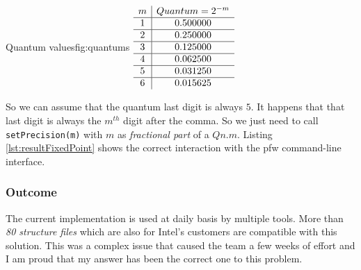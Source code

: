 \begin{figureGraphics}{Quantum values}{fig:quantums}
    $
    \begin{array}{c|c}
        m & Quantum = 2^{-m} \\
        \hline
        1 & 0.500000 \\
        \hline
        2 & 0.250000 \\
        \hline
        3 & 0.125000 \\
        \hline
        4 & 0.062500 \\
        \hline
        5 & 0.031250 \\
        \hline
        6 & 0.015625
    \end{array}
    \vspace{0.3cm}
    $
\end{figureGraphics}

So we can assume that the quantum last digit is always $5$.
It happens that that last digit is always the $m^{th}$ digit after the comma.
So we just need to call \lstinline{setPrecision(m)} with $m$ as \emph{fractional part} of a $Qn.m$.
Listing \ref{lst:resultFixedPoint} shows the correct interaction with the \gls{pfw} command-line interface.


\subsubsection{Outcome}

The current implementation is used at daily basis by multiple tools.
More than \emph{80 structure files} which are also for Intel's customers are compatible with this solution.
This was a complex issue that caused the team a few weeks of effort and I am proud that my answer has been the
correct one to this problem.


